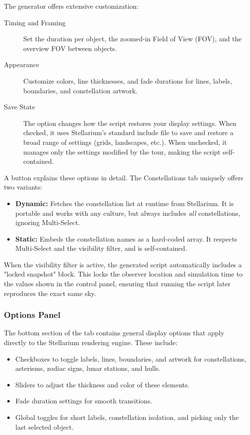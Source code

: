 The generator offers extensive customization:
\begin{description}
\item[Timing and Framing] Set the duration per object, the zoomed-in Field of View (FOV), and the overview FOV between objects.
\item[Appearance] Customize colors, line thicknesses, and fade durations for lines, labels, boundaries, and constellation artwork.
\item[Save State] The  option changes how the script restores your display settings. When checked, it uses Stellarium's standard include file to save and restore a broad range of settings (grids, landscapes, etc.). When unchecked, it manages only the settings modified by the tour, making the script self-contained.
\end{description}

A  button explains these options in detail. The Constellations tab uniquely offers two variants:
\begin{itemize}
\item \textbf{Dynamic:} Fetches the constellation list at runtime from Stellarium. It is portable and works with any culture, but always includes \emph{all} constellations, ignoring Multi-Select.
\item \textbf{Static:} Embeds the constellation names as a hard-coded array. It respects Multi-Select and the visibility filter, and is self-contained.
\end{itemize}

When the visibility filter is active, the generated script automatically includes a "locked snapshot" block. This locks the observer location and simulation time to the values shown in the control panel, ensuring that running the script later reproduces the exact same sky.

\subsubsection{Options Panel}
\label{sec:SkyCulture:OptionsPanel}

The bottom section of the tab contains general display options that apply directly to the Stellarium rendering engine. These include:
\begin{itemize}
\item Checkboxes to toggle labels, lines, boundaries, and artwork for constellations, asterisms, zodiac signs, lunar stations, and hulls.
\item Sliders to adjust the thickness and color of these elements.
\item Fade duration settings for smooth transitions.
\item Global toggles for short labels, constellation isolation, and picking only the last selected object.
\end{itemize}

